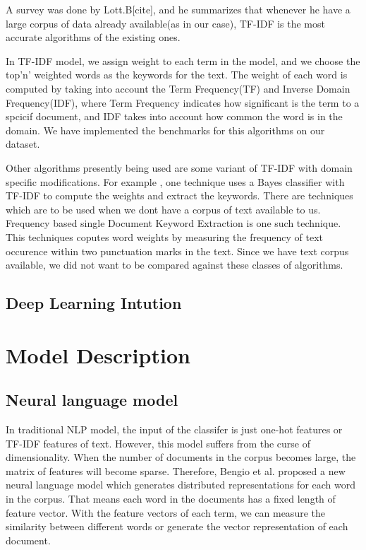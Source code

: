 \documentclass[dvips,12pt]{article}
\begin{document}
		A survey was done by Lott.B[cite], and he summarizes that whenever he have a large corpus of data already available(as in our case), TF-IDF is the most accurate algorithms of the existing ones. 
		
		In TF-IDF model, we assign weight to each term in the model, and we choose the top'n' weighted words as the keywords for the text. The weight of each word is computed by taking into account the Term Frequency(TF) and Inverse Domain Frequency(IDF), where Term Frequency indicates how significant is the term to a spcicif document, and IDF takes into account how common the word is in the domain. We have implemented the benchmarks for this algorithms on our dataset.
		
		Other algorithms presently being used are some variant of TF-IDF with domain specific modifications. For example , one technique uses a Bayes classifier with TF-IDF to compute the weights and extract the keywords. 
		There are techniques which are to be used when we dont have a corpus of text available to us. Frequency based single Document Keyword Extraction is one such technique. This techniques coputes word weights by measuring the frequency of text occurence within two punctuation marks in the text. Since we have text corpus available, we did not want to be compared against these classes of algorithms.
		\subsection{Deep Learning Intution}
	\section{Model Description}
\subsection{Neural language model}
In traditional NLP model, the input of the classifer is just one-hot features or TF-IDF features of text. However, this model suffers from the curse of dimensionality. When the number of documents in the corpus becomes large, the matrix of features will become sparse. Therefore, Bengio et al.\cite{Bengio2003NLP} proposed a new neural language model which generates distributed representations for each word in the corpus. That means each word in the documents has a fixed length of feature vector. With the feature vectors of each term, we can measure the similarity between different words or generate the vector representation of each document.
\end{document}
